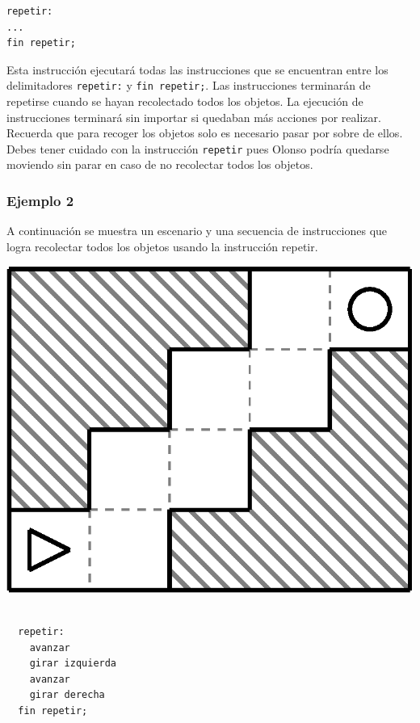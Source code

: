 \documentclass{oci}
\def\bgcolor{\par\setbox0\vbox\bgroup}
\def\endbgcolor{\egroup\fboxsep0pt \noindent\colorbox[gray]{0.95}{\usebox0}\par}
\begin{document}
\begin{problemDescription}
\begin{verbatim}
repetir:
...
fin repetir;
\end{verbatim}

Esta instrucción ejecutará todas las instrucciones que se encuentran entre los delimitadores \texttt{repetir:} y \texttt{fin repetir;}.
Las instrucciones terminarán de repetirse cuando se hayan recolectado todos los objetos.
La ejecución de instrucciones terminará sin importar si quedaban más acciones por realizar.
Recuerda que para recoger los objetos solo es necesario pasar por sobre de ellos.
Debes tener cuidado con la instrucción \texttt{repetir} pues Olonso podría quedarse moviendo sin parar en caso de no recolectar todos los objetos.

\subsubsection*{Ejemplo 2}
A continuación se muestra un escenario y una secuencia de instrucciones que logra recolectar todos los objetos usando la instrucción repetir.

\begin{minipage}{0.5\linewidth}
  \centering
  \includegraphics[scale=0.45]{laberintos/ejemplo2.eps}
\end{minipage}
\begin{minipage}{0.5\linewidth}
  \centering
 \bgcolor{}
\begin{verbatim}

  repetir:
    avanzar
    girar izquierda
    avanzar
    girar derecha
  fin repetir;
\end{verbatim}
 \endbgcolor{}
\end{minipage}



\end{problemDescription}
\end{document}
